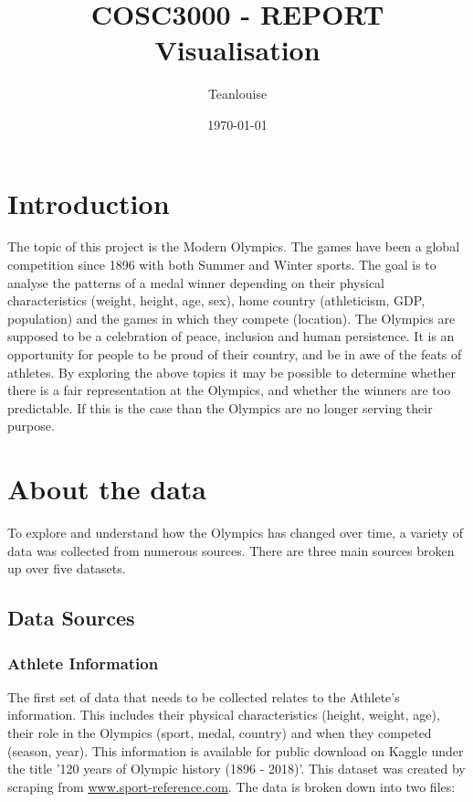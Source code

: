 \documentclass[a4 paper, 12pt]{article}
\title{COSC3000 - REPORT \\ Visualisation}
\author{Teanlouise}
\date{\today}
\begin{document}
\maketitle

\pagebreak
\tableofcontents

\pagebreak
\section{Introduction}
The topic of this project is the Modern Olympics. The games have been a global competition since 1896 with both Summer and Winter sports. The goal is to analyse the patterns of a medal winner depending on their physical characteristics (weight, height, age, sex), home country (athleticism, GDP, population) and the games in which they compete (location). The Olympics are supposed to be a celebration of peace, inclusion and human persistence. It is an opportunity for people to be proud of their country, and be in awe of the feats of athletes. By exploring the above topics it may be possible to determine whether there is a fair representation at the Olympics, and whether the winners are too predictable. If this is the case than the Olympics are no longer serving their purpose.

\section{About the data}
To explore and understand how the Olympics has changed over time, a variety of data was collected from numerous sources. There are three main sources broken up over five datasets. 

\subsection{Data Sources}

    \subsubsection{Athlete Information}
    The first set of data that needs to be collected relates to the Athlete's information. This includes their physical characteristics (height, weight, age), their role in the Olympics (sport, medal, country) and when they competed (season, year). This information is available for public download on Kaggle under the title '120 years of Olympic history (1896 - 2018)'. This dataset was created by scraping from \url{www.sport-reference.com}. The data is broken down into two files:
\end{document}

